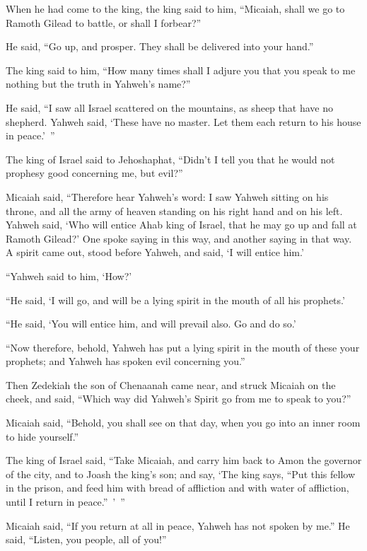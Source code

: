 {\par }{\PP {}When he had come to the king, the king said to him, “Micaiah, shall we go to Ramoth Gilead to battle, or shall I forbear?”
\par }{\PP He said, “Go up, and prosper. They shall be delivered into your hand.”
\par }{\PP {}The king said to him, “How many times shall I adjure you that you speak to me nothing but the truth in Yahweh’s name?”
\par }{\PP {}He said, “I saw all Israel scattered on the mountains, as sheep that have no shepherd. Yahweh said, ‘These have no master. Let them each return to his house in peace.’ ”
\par }{\PP {}The king of Israel said to Jehoshaphat, “Didn’t I tell you that he would not prophesy good concerning me, but evil?”
\par }{\PP {}Micaiah said, “Therefore hear Yahweh’s word: I saw Yahweh sitting on his throne, and all the army of heaven standing on his right hand and on his left.
Yahweh said, ‘Who will entice Ahab king of Israel, that he may go up and fall at Ramoth Gilead?’ One spoke saying in this way, and another saying in that way.
A spirit came out, stood before Yahweh, and said, ‘I will entice him.’
\par }{\PP “Yahweh said to him, ‘How?’
\par }{\PP {}“He said, ‘I will go, and will be a lying spirit in the mouth of all his prophets.’
\par }{\PP “He said, ‘You will entice him, and will prevail also. Go and do so.’
\par }{\PP {}“Now therefore, behold, Yahweh has put a lying spirit in the mouth of these your prophets; and Yahweh has spoken evil concerning you.”
\par }{\PP {}Then Zedekiah the son of Chenaanah came near, and struck Micaiah on the cheek, and said, “Which way did Yahweh’s Spirit go from me to speak to you?”
\par }{\PP {}Micaiah said, “Behold, you shall see on that day, when you go into an inner room to hide yourself.”
\par }{\PP {}The king of Israel said, “Take Micaiah, and carry him back to Amon the governor of the city, and to Joash the king’s son;
and say, ‘The king says, “Put this fellow in the prison, and feed him with bread of affliction and with water of affliction, until I return in peace.” ’ ”
\par }{\PP {}Micaiah said, “If you return at all in peace, Yahweh has not spoken by me.” He said, “Listen, you people, all of you!”
}
